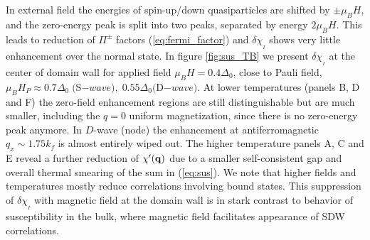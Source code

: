 \documentclass[prb,aps,showpacs,amsmath,twocolumn,10pt]{revtex4-1}
\newcommand{\blue}{\textcolor{blue}}
\newcommand{\red}{\textcolor{red}}
\begin{document}
In external field the energies of spin-up/down quasiparticles are shifted by $\pm \mu_B H$, 
and the zero-energy peak is split into two peaks, separated by energy $2\mu_B H$. This leads to 
reduction of $\Pi^{\pm}$ factors (\ref{eq:fermi_factor}) 
and $\delta\chi_{{}_I}$ shows very little enhancement over the normal state. 
In figure \ref{fig:sus_TB} we present $\delta\chi_{{}_I}$ at the center of domain wall for applied field
$\mu_B H = 0.4\Delta_0$, close to Pauli field, $\mu_B H_P \approx 0.7 \Delta_0\; ($S$-wave),\; 0.55\Delta_0 ($D$-wave)$. 
At lower temperatures (panels B, D and F) the zero-field enhancement regions %
are still distinguishable but are much smaller, including the $q=0$ uniform magnetization, since there is no 
zero-energy peak anymore. In $D$-wave (node) the enhancement at antiferromagnetic $q_x \sim 1.75 k_f$ is 
almost entirely wiped out. 
The higher temperature panels A, C and E reveal a further reduction of $\chi'({\bf q})$ due to a smaller self-consistent gap
and overall thermal smearing of the sum in (\ref{eq:sus}).   
We note that higher fields and temperatures mostly reduce correlations involving bound states. 
%
This suppression of $\delta\chi_{{}_I}$ with magnetic field at the domain wall is in stark contrast %
to behavior of susceptibility in the bulk, where magnetic field facilitates appearance of SDW 
correlations.\cite{Ikeda:2010eo,sc_afm_kato,Rosemeyer2014} 
\end{document}
